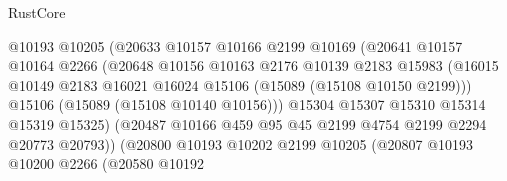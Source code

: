 \begin{lexlean}{RustCore}
\begin{coremodule}
                                    @10193
                                    @10205
                                    (@20633
                                      @10157
                                      @10166
                                      @2199
                                      @10169
                                      (@20641
                                        @10157
                                        @10164
                                        @2266
                                        (@20648
                                          @10156
                                          @10163
                                          @2176
                                          @10139
                                          @2183
                                          @15983
                                          (@16015
                                            @10149
                                            @2183
                                            @16021
                                            @16024
                                            @15106
                                            (@15089 (@15108 @10150 @2199)))
                                          @15106
                                          (@15089 (@15108 @10140 @10156)))
                                        @15304
                                        @15307
                                        @15310
                                        @15314
                                        @15319
                                        @15325)
                                      (@20487
                                        @10166
                                        @459
                                        @95
                                        @45
                                        @2199
                                        @4754
                                        @2199
                                        @2294
                                        @20773
                                        @20793))
                                    (@20800
                                      @10193
                                      @10202
                                      @2199
                                      @10205
                                      (@20807
                                        @10193
                                        @10200
                                        @2266
                                        (@20580
                                          @10192

\end{coremodule}
\end{lexlean}

